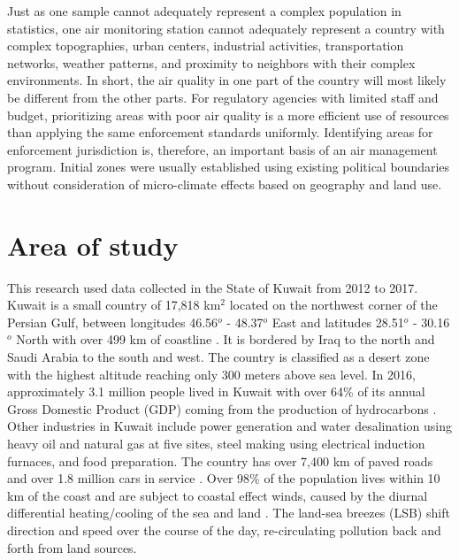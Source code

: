 Just as one sample cannot adequately represent a complex population in statistics, one air monitoring station cannot adequately represent a country with complex topographies, urban centers, industrial activities, transportation networks, weather patterns, and proximity to neighbors with their complex environments.  In short, the air quality in one part of the country will most likely be different from the other parts. For regulatory agencies with limited staff and budget, prioritizing areas with poor air quality is a more efficient use of resources than applying the same enforcement standards uniformly. Identifying areas for enforcement jurisdiction is, therefore, an important basis of an air management program. Initial zones were usually established using existing political boundaries without consideration of micro-climate effects based on geography and land use.  

\section{Area of study}

This research used data collected in the State of Kuwait from 2012 to 2017. Kuwait is a small country of 17,818 km$^{2}$ located on the northwest corner of the Persian Gulf, between longitudes 46.56$^{o}$ - 48.37$^{o}$ East and latitudes 28.51$^{o}$ - 30.16$^{o}$ North with over 499 km of coastline \citep{CIA2015}. It is bordered by Iraq to the north and Saudi Arabia to the south and west. The country is classified as a desert zone with the highest altitude reaching only 300 meters above sea level.   In 2016, approximately 3.1 million people lived in Kuwait \citep{CSB2017} with over 64\% of its annual Gross Domestic Product (GDP) coming from the production of hydrocarbons \citep{KAMCO2013}.  Other industries in Kuwait include power generation and water desalination using heavy oil and natural gas at five sites, steel making using electrical induction furnaces, and food preparation.  The country has over 7,400 km of paved roads and over 1.8 million cars in service \citep{CSB2014}.  Over 98\% of the population lives within 10 km of the coast and are subject to coastal effect winds, caused by the diurnal differential heating/cooling of the sea and land \citep{Crosman2010, Cuxart2014}.  The land-sea breezes (LSB) shift direction and speed over the course of the day, re-circulating pollution back and forth from land sources.

